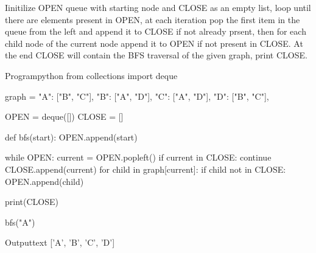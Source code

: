 \documentclass[11pt]{ipu-ai}
\begin{document}
    \newpage%

    {Iinitilize OPEN queue with starting node and CLOSE as an empty list, loop until there are elements present in OPEN,
    at each iteration pop the first item in the queue from the left and append it to CLOSE if not already prsent, then
    for each child node of the current node append it to OPEN if not present in CLOSE. At the end CLOSE will contain the
    BFS traversal of the given graph, print CLOSE.}

    \begin{code}
        {Program}{python}
from collections import deque

graph = {
    "A": ["B", "C"],
    "B": ["A", "D"],
    "C": ["A", "D"],
    "D": ["B", "C"],
}

OPEN = deque([])
CLOSE = []


def bfs(start):
    OPEN.append(start)

    while OPEN:
        current = OPEN.popleft()
        if current in CLOSE:
            continue
        CLOSE.append(current)
        for child in graph[current]:
            if child not in CLOSE:
                OPEN.append(child)

    print(CLOSE)


bfs("A")
    \end{code}
    \begin{code}
        {Output}{text}
['A', 'B', 'C', 'D']
    \end{code}

\end{document}
